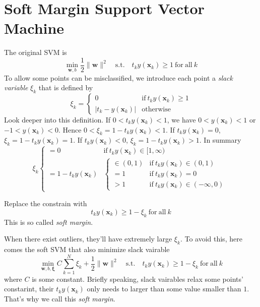 \documentclass{article}
\begin{document}
    \section{Soft Margin Support Vector Machine}
        The original SVM is
        \[
            \min_{\mathbf{w},b} \frac{1}{2} \|\mathbf{w}\|^2 \mathrm{\quad s.t. \quad} t_k y(\mathbf{x}_k) \geq 1 \mathrm{~for~all~}k
        \]
        To allow some points can be misclassified, we introduce each point a \textit{slack variable} $\xi_k$ that is defined by
        \[
            \xi_k = \left\{
                        \begin{array}{rl}
                            0 & \mathrm{if ~} t_k y(\mathbf{x}_k) \geq 1 \\
                            |t_k - y(\mathbf{x}_k)| & \mathrm{otherwise}
                        \end{array}
                    \right.    
        \]
        Look deeper into this definition. If $0 < t_k y(\mathbf{x}_k) < 1$, we have $0 < y(\mathbf{x}_k) < 1$ or $-1 < y(\mathbf{x}_k) < 0$. Hence
        $0 < \xi_k = 1 - t_k y(\mathbf{x}_k) < 1$. If $t_k y(\mathbf{x}_k) = 0$, $\xi_k = 1 - t_k y(\mathbf{x}_k) = 1$. If $t_k y(\mathbf{x}_k) < 0$, $\xi_k = 1 - t_k y(\mathbf{x}_k) > 1$. In summary
        \[
            \xi_k \left\{
                        \begin{array}{ll}
                            = 0 & \mathrm{if ~} t_k y(\mathbf{x}_k) \in [1,\infty) \\
                            = 1 - t_k y(\mathbf{x}_k) & 
                            \left\{
                                \begin{array}{ll}
                                    \in (0, 1) & \mathrm{if ~} t_k y(\mathbf{x}_k) \in (0, 1)\\
                                    = 1 & \mathrm{if ~} t_k y(\mathbf{x}_k) = 0\\
                                    > 1 & \mathrm{if ~} t_k y(\mathbf{x}_k) \in (-\infty, 0)
                                \end{array}
                            \right.
                        \end{array}
                    \right.
        \]
        
        Replace the constrain with
        \[
            t_k y(\mathbf{x}_k) \geq 1 - \xi_k \mathrm{~for~all~}k
        \]
        This is so called \textit{soft margin}.

        When there exist outliers, they'll have extremely large $\xi_k$. To avoid this, here comes the soft SVM that also minimize slack vairable
        \[
            \min_{\mathbf{w},b, \mathbf{\xi}} C \sum_{k=1}^N \xi_k + \frac{1}{2} \|\mathbf{w}\|^2 \mathrm{\quad s.t. \quad} t_k y(\mathbf{x}_k) \geq 1 - \xi_k \mathrm{~for~all~}k
        \]
        where $C$ is some constant. Briefly speaking, slack vairables relax some points' constarint, their $t_k y(\mathbf{x}_k)$ only needs to larger than some value smaller than $1$. That's why we call this \textit{soft margin}.
\end{document}
